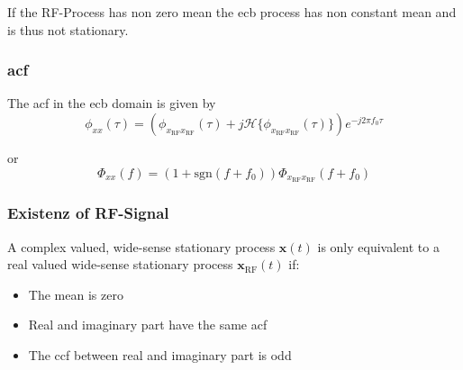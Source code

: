 If the RF-Process has non zero mean the \ac{ecb} process has non constant mean and is thus
not stationary.

\subsubsection{\acl{acf}}
The \ac{acf} in the \ac{ecb} domain is given by
\begin{equation}
    \phi_{xx}(\tau) = \left(\phi_{x_\text{RF} x_\text{RF}} (\tau) + j 
        \mathcal{H}\{\phi_{x_\text{RF} x_\text{RF}} (\tau)\}\right)
        e^{-j 2 \pi f_0 \tau}
\end{equation}

or
\begin{equation}
    \Phi_{xx}(f) = (1 + \text{sgn}(f+f_0)) \Phi_{x_\text{RF} x_\text{RF}}(f+f_0)
\end{equation}

\subsubsection{Existenz of RF-Signal}
A complex valued, wide-sense stationary process $\mathbf{x}(t)$ is only equivalent
to a real valued wide-sense stationary process $\mathbf{x}_\text{RF}(t)$ if:
\begin{itemize}
    \item The mean is zero
    \item Real and imaginary part have the same \ac{acf}
    \item The \ac{ccf} between real and imaginary part is odd
\end{itemize}

